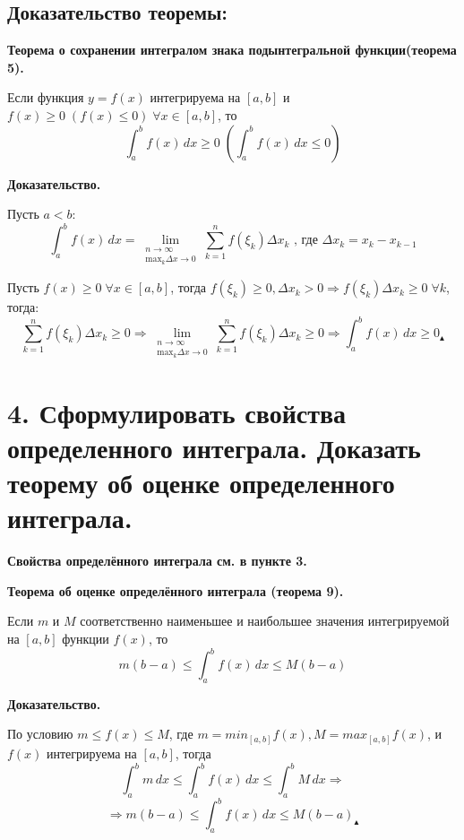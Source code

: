 \documentclass[11pt]{article}
\begin{document}
\subsection*{Доказательство теоремы:}
\par\textbf{Теорема о сохранении интегралом знака подынтегральной функции(теорема 5).}
\par Если функция $y = f(x)$ интегрируема на $[a, b]$ и $f(x) \geq 0 \; (f(x) \leq 0) \; \forall x \in [a, b]$, то $$\int_{a}^b f(x) \, dx \geq 0 \; \left( \int_{a}^b f(x) \, dx \leq 0 \right)$$
\par\textbf{Доказательство.}
\par Пусть $a < b$: $$\int_{a}^b f(x) \, dx = \lim_{ \substack{n \to \infty \\ \text{max}_{k}\Delta x \to 0}} \sum_{k = 1}^n f(\xi_{k}) \Delta x_{k}\text{ , где } \Delta x_{k} = x_{k} - x_{k - 1}$$
\par Пусть $f(x) \geq 0 \; \forall x \in [a, b]$, тогда $f(\xi_{k}) \geq 0, \Delta x_{k} > 0 \Rightarrow f(\xi_{k}) \Delta x_{k} \geq 0 \; \forall k$, тогда: $$\sum_{k=1}^n f(\xi_{k}) \Delta x_{k} \geq 0 \Rightarrow \lim_{ \substack{n \to \infty \\ \text{max}_{k}\Delta x \to 0}} \sum_{k = 1}^n f(\xi_{k}) \Delta x_{k} \geq 0 \Rightarrow \int_{a}^b f(x) \, dx \geq 0 _\blacktriangle$$

\section*{4. Сформулировать свойства определенного интеграла. Доказать теорему об оценке определенного интеграла.}
\par\textbf{Свойства определённого интеграла см. в пункте 3.}
\par\textbf{Теорема об оценке определённого интеграла (теорема 9).}
\par Если $m$ и $M$ соответственно наименьшее и наибольшее значения интегрируемой на $[a, b]$ функции $f(x)$, то $$m(b - a) \leq \int_{a}^b f(x) \, dx \leq M(b - a)$$
\par\textbf{Доказательство.}
\par По условию $m \leq f(x) \leq M$, где $m = min_{[a, b]} f(x), M = max_{[a, b]} f(x)$, и $f(x)$ интегрируема на $[a, b]$, тогда
$$\int_a^b  m \, dx \leq \int_{a}^b f(x)\, dx  \leq \int_{a}^b M \, dx \Rightarrow$$
$$\Rightarrow m(b - a) \leq \int_{a}^b f(x)\, dx \leq M(b - a) _\blacktriangle$$
\end{document}
